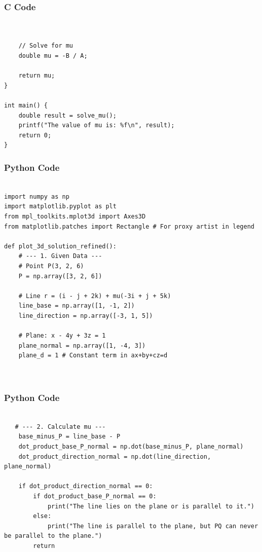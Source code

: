 \documentclass{beamer}
\begin{document}
\begin{frame}[fragile]
    \frametitle{C Code}
    \begin{lstlisting}


    // Solve for mu
    double mu = -B / A;
    
    return mu;
}

int main() {
    double result = solve_mu();
    printf("The value of mu is: %f\n", result);
    return 0;
}

    \end{lstlisting}
\end{frame}

\begin{frame}[fragile]
    \frametitle{Python Code}
    \begin{lstlisting}

import numpy as np
import matplotlib.pyplot as plt
from mpl_toolkits.mplot3d import Axes3D
from matplotlib.patches import Rectangle # For proxy artist in legend

def plot_3d_solution_refined():
    # --- 1. Given Data ---
    # Point P(3, 2, 6)
    P = np.array([3, 2, 6])

    # Line r = (i - j + 2k) + mu(-3i + j + 5k)
    line_base = np.array([1, -1, 2])
    line_direction = np.array([-3, 1, 5])

    # Plane: x - 4y + 3z = 1
    plane_normal = np.array([1, -4, 3])
    plane_d = 1 # Constant term in ax+by+cz=d

 

    \end{lstlisting}
\end{frame}

\begin{frame}[fragile]
    \frametitle{Python Code}
    \begin{lstlisting}

   # --- 2. Calculate mu ---
    base_minus_P = line_base - P
    dot_product_base_P_normal = np.dot(base_minus_P, plane_normal)
    dot_product_direction_normal = np.dot(line_direction, plane_normal)

    if dot_product_direction_normal == 0:
        if dot_product_base_P_normal == 0:
            print("The line lies on the plane or is parallel to it.")
        else:
            print("The line is parallel to the plane, but PQ can never be parallel to the plane.")
        return

   

    \end{lstlisting}
\end{frame}
\end{document}
